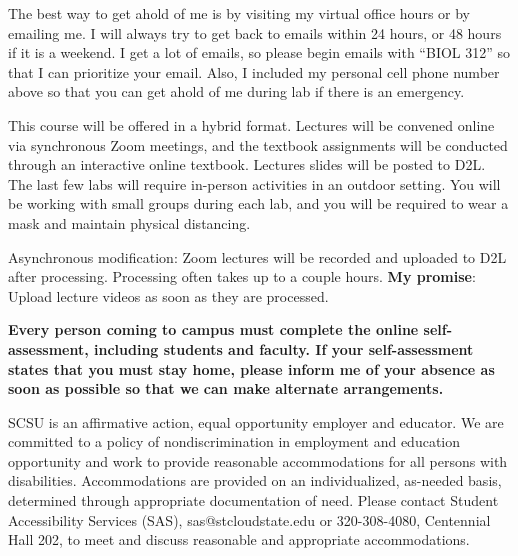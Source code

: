 \documentclass{tufte-handout}
\begin{document}
\begin{fullwidth}
\newpage


 The best way to get ahold of me is by visiting my virtual office hours or by emailing me. I will always try to get back to emails within 24 hours, or 48 hours if it is a weekend. I get a lot of emails, so please begin emails with ``BIOL 312'' so that I can prioritize your email. Also, I included my personal cell phone number above so that you can get ahold of me during lab if there is an emergency.

 This course will be offered in a hybrid format. Lectures will be convened online via synchronous Zoom meetings, and the textbook assignments will be conducted through an interactive online textbook. Lectures slides will be posted to D2L. The last few labs will require in-person activities in an outdoor setting. You will be working with small groups during each lab, and you will be required to wear a mask and maintain physical distancing. 

\color{blue}
Asynchronous modification: Zoom lectures will be recorded and uploaded to D2L after processing. Processing often takes up to a couple hours. \textbf{My promise}: Upload lecture videos as soon as they are processed. 
\color{black}

\textbf{Every person coming to campus must complete the online self-assessment, including students and faculty. If your self-assessment states that you must stay home, please inform me of your absence as soon as possible so that we can make alternate arrangements.}




 SCSU is an affirmative action, equal opportunity employer and educator. We are committed to a policy of nondiscrimination in employment and education opportunity and work to provide reasonable accommodations for all persons with disabilities. Accommodations are provided on an individualized, as-needed basis, determined through appropriate documentation of need. Please contact Student Accessibility Services (SAS), sas@stcloudstate.edu or 320-308-4080, Centennial Hall 202, to meet and discuss reasonable and appropriate accommodations. 


\end{fullwidth}
\end{document}
